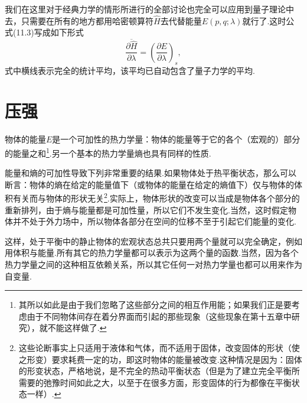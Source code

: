 我们在这里对于经典力学的情形所进行的全部讨论也完全可以应用到量子理论中去，只需要在所有的地方都用哈密顿算符$\hat{H}$去代替能量$E(p,q;\lambda)$就行了.这时公式(11.3)写成如下形式
\begin{equation}
  \overline{\frac{\partial\hat{H}}{\partial\lambda}}
  =\left(\frac{\partial E}{\partial\lambda}\right)_s,
\end{equation}
式中横线表示完全的统计平均，该平均已自动包含了量子力学的平均.

\section{压强}

物体的能量$E$是一个可加性的热力学量：物体的能量等于它的各个（宏观的）部分的能量之和\footnote{其所以如此是由于我们忽略了这些部分之间的相互作用能；如果我们正是要考虑由于不同物体间存在着分界面而引起的那些现象（这些现象在第十五章中研究），就不能这样做了.}.另一个基本的热力学量熵也具有同样的性质.

能量和熵的可加性导致下列非常重要的结果.如果物体处于热平衡状态，那么可以断言：物体的熵在给定的能量值下（或物体的能量在给定的熵值下）仅与物体的体积有关而与物体的形状无关\footnote{这些论断事实上只适用于液体和气体，而不适用于固体，改变固体的形状（使之形变）要求耗费一定的功，即这时物体的能量被改变.这种情况是因为：固体的形变状态，严格地说，是不完全的热动平衡状态（但是为了建立完全平衡所需要的弛豫时间如此之大，以至于在很多方面，形变固体的行为都像在平衡状态一样）.}.实际上，物体形状的改变可以当成是物体各个部分的重新排列，由于熵与能量都是可加性量，所以它们不发生变化.当然，这时假定物体并不处于外力场中，所以物体各部分在空间的位移不至于引起它们能量的变化.

这样，处于平衡中的静止物体的宏观状态总共只要用两个量就可以完全确定，例如用体积与能量.所有其它的热力学量都可以表示为这两个量的函数.当然，因为各个热力学量之间的这种相互依赖关系，所以其它任何一对热力学量也都可以用来作为自变量.

